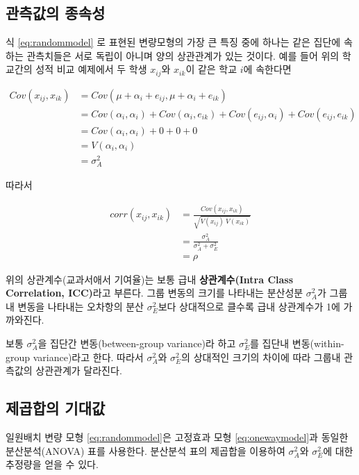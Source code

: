 \documentclass[
]{book}
\theoremstyle{definition}
\theoremstyle{definition}
\theoremstyle{definition}
\theoremstyle{remark}
\begin{document}
\hypertarget{uxad00uxce21uxac12uxc758-uxc885uxc18duxc131}{%
\subsection{관측값의 종속성}\label{uxad00uxce21uxac12uxc758-uxc885uxc18duxc131}}

식 \eqref{eq:randommodel} 로 표현된 변량모형의 가장 큰 특징 중에 하나는 같은 집단에 속하는 관측치들은 서로 독립이 아니며 양의 상관관계가 있는 것이다. 예를 들어 위의 학교간의 성적 비교 예제에서 두 학생 \(x_{ij}\)와 \(x_{ik}\)이 같은 학교 \(i\)에 속한다면

\begin{align*}
 Cov(x_{ij},x_{ik}) &  = Cov(  \mu + \alpha_i + e_{ij}, \mu + \alpha_i + e_{ik})  \\
  & =Cov (\alpha_i, \alpha_i) + Cov( \alpha_i, e_{ik}) + Cov( e_{ij}, \alpha_i ) + Cov( e_{ij}, e_{ik}) \\ 
  & = Cov (\alpha_i, \alpha_i) + 0 + 0 + 0 \\
  & = V (\alpha_i, \alpha_i) \\
  & = \sigma^2_A 
\end{align*}

따라서

\begin{align*}
corr(x_{ij},x_{ik}) & = \frac{ Cov(x_{ij},x_{ik})}{\sqrt{V(x_{ij}) ~V(x_{ik})} } \\
 & = \frac{\sigma^2_A }{\sigma^2_A + \sigma^2_E } \\
 & =\rho
\end{align*}

위의 상관계수(교과서애서 기여율)는 보통 급내 \textbf{상관계수(Intra Class Correlation, ICC)}라고 부른다. 그룹 변동의 크기를 나타내는 분산성분 \(\sigma^2_A\)가 그룹 내 변동을 나타내는 오차항의 분산 \(\sigma^2_E\)보다 상대적으로 클수록 급내 상관계수가 1에 가까와진다.

보통 \(\sigma^2_A\)을 집단간 변동(between-group variance)라 하고 \(\sigma^2_E\)를 집단내 변동(within-group variance)라고 한다. 따라서 \(\sigma^2_A\)와 \(\sigma^2_E\)의 상대적인 크기의 차이에 따라
그룹내 관측값의 상관관계가 달라진다.

\hypertarget{uxc81cuxacf1uxd569uxc758-uxae30uxb300uxac12}{%
\subsection{제곱합의 기대값}\label{uxc81cuxacf1uxd569uxc758-uxae30uxb300uxac12}}

일원배치 변량 모형 \eqref{eq:randommodel}은 고정효과 모형 \eqref{eq:onewaymodel}과 동일한 분산분석(ANOVA) 표를 사용한다. 분산분석 표의 제곱합을 이용하여 \(\sigma^2_A\)와 \(\sigma^2_E\)에 대한 추정량을 얻을 수 있다.
\end{document}
